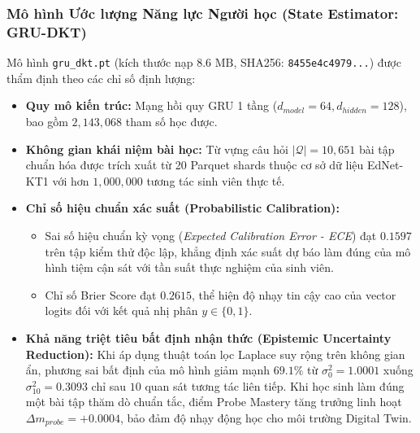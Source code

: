 \subsubsection{Mô hình Ước lượng Năng lực Người học (State Estimator: GRU-DKT)}
Mô hình \texttt{gru\_dkt.pt} (kích thước nạp $8.6\text{ MB}$, SHA256: \texttt{8455e4c4979...}) được thẩm định theo các chỉ số định lượng:
\begin{itemize}
  \item \textbf{Quy mô kiến trúc:} Mạng hồi quy GRU 1 tầng ($d_{model} = 64, d_{hidden} = 128$), bao gồm $2,143,068$ tham số học được.
  \item \textbf{Không gian khái niệm bài học:} Từ vựng câu hỏi $|\mathcal{Q}| = 10,651$ bài tập chuẩn hóa được trích xuất từ 20 Parquet shards thuộc cơ sở dữ liệu EdNet-KT1 với hơn $1,000,000$ tương tác sinh viên thực tế.
  \item \textbf{Chỉ số hiệu chuẩn xác suất (Probabilistic Calibration):} 
  \begin{itemize}
    \item Sai số hiệu chuẩn kỳ vọng (\textit{Expected Calibration Error - ECE}) đạt $\mathbf{0.1597}$ trên tập kiểm thử độc lập, khẳng định xác suất dự báo làm đúng của mô hình tiệm cận sát với tần suất thực nghiệm của sinh viên.
    \item Chỉ số Brier Score đạt $\mathbf{0.2615}$, thể hiện độ nhạy tin cậy cao của vector logits đối với kết quả nhị phân $y \in \{0, 1\}$.
  \end{itemize}
  \item \textbf{Khả năng triệt tiêu bất định nhận thức (Epistemic Uncertainty Reduction):} Khi áp dụng thuật toán lọc Laplace suy rộng trên không gian ẩn, phương sai bất định của mô hình giảm mạnh $69.1\%$ từ $\sigma_0^2 = 1.0001$ xuống $\sigma_{10}^2 = 0.3093$ chỉ sau $10$ quan sát tương tác liên tiếp. Khi học sinh làm đúng một bài tập thăm dò chuẩn tắc, điểm Probe Mastery tăng trưởng linh hoạt $\Delta m_{probe} = +0.0004$, bảo đảm độ nhạy động học cho môi trường Digital Twin.
\end{itemize}


